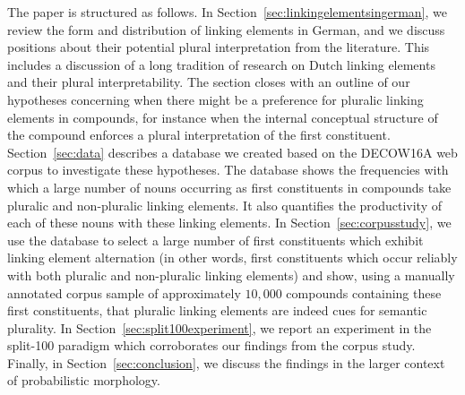 The paper is structured as follows.
In Section~\ref{sec:linkingelementsingerman}, we review the form and distribution of linking elements in German, and we discuss positions about their potential plural interpretation from the literature.
This includes a discussion of a long tradition of research on Dutch linking elements and their plural interpretability.
The section closes with an outline of our hypotheses concerning when there might be a preference for pluralic linking elements in compounds, for instance when the internal conceptual structure of the compound enforces a plural interpretation of the first constituent.
Section~\ref{sec:data} describes a database we created based on the DECOW16A web corpus to investigate these hypotheses.
The database shows the frequencies with which a large number of nouns occurring as first constituents in compounds take pluralic and non-pluralic linking elements.
It also quantifies the productivity of each of these nouns with these linking elements.
In Section~\ref{sec:corpusstudy}, we use the database to select a large number of first constituents which exhibit linking element alternation (in other words, first constituents which occur reliably with both pluralic and non-pluralic linking elements) and show, using a manually annotated corpus sample of approximately $10,000$ compounds containing these first constituents, that pluralic linking elements are indeed cues for semantic plurality.
In Section~\ref{sec:split100experiment}, we report an experiment in the split-100 paradigm which corroborates our findings from the corpus study.
Finally, in Section~\ref{sec:conclusion}, we discuss the findings in the larger context of probabilistic morphology.

